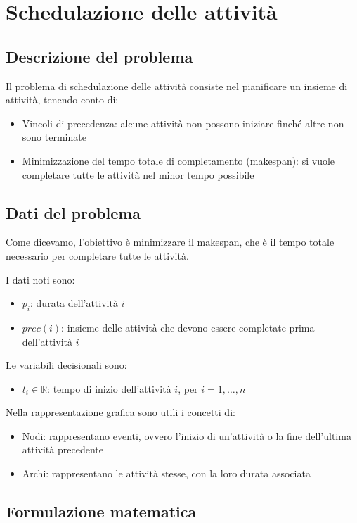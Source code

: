 \section{Schedulazione delle attività}
\subsection{Descrizione del problema}

Il problema di schedulazione delle attività consiste nel pianificare un insieme di attività,
tenendo conto di:
\begin{itemize}
    \item Vincoli di precedenza: alcune attività non possono iniziare finché altre non sono terminate
    \item Minimizzazione del tempo totale di completamento (makespan): si vuole completare tutte le attività nel minor tempo possibile
\end{itemize}

\subsection{Dati del problema}
Come dicevamo, l'obiettivo è minimizzare il makespan, che è il tempo totale necessario per completare tutte le attività.

I dati noti sono:
\begin{itemize}
    \item $p_i$: durata dell'attività $i$
    \item $prec(i)$: insieme delle attività che devono essere completate prima dell'attività $i$
\end{itemize}

Le variabili decisionali sono:
\begin{itemize}
    \item $t_i \in \mathbb{R}$: tempo di inizio dell'attività $i$, per $i=1,\ldots,n$
\end{itemize}

Nella rappresentazione grafica sono utili i concetti di:
\begin{itemize}
    \item Nodi: rappresentano eventi, ovvero l'inizio di un'attività o la fine dell'ultima attività precedente
    \item Archi: rappresentano le attività stesse, con la loro durata associata
\end{itemize}

\subsection{Formulazione matematica}
